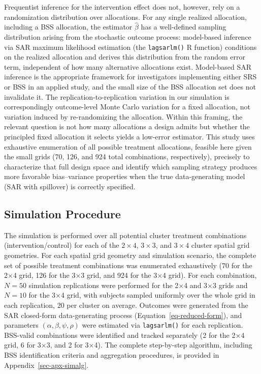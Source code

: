 \documentclass[
  12pt,
  prelim]{bios-prelim}
\begin{document}
Frequentist inference for the intervention effect does not, however,
rely on a randomization distribution over allocations. For any single
realized allocation, including a BSS allocation, the estimator
\(\hat{\beta}\) has a well-defined sampling distribution arising from
the stochastic outcome process: model-based inference via SAR maximum
likelihood estimation (the \texttt{lagsarlm()} R function) conditions on
the realized allocation and derives this distribution from the random
error term, independent of how many alternative allocations exist.
Model-based SAR inference is the appropriate framework for investigators
implementing either SRS or BSS in an applied study, and the small size
of the BSS allocation set does not invalidate it. The
replication-to-replication variation in our simulation is
correspondingly outcome-level Monte Carlo variation for a fixed
allocation, not variation induced by re-randomizing the allocation.
Within this framing, the relevant question is not how many allocations a
design admits but whether the principled fixed allocation it selects
yields a low-error estimator. This study uses exhaustive enumeration of
all possible treatment allocations, feasible here given the small grids
(70, 126, and 924 total combinations, respectively), precisely to
characterize that full design space and identify which sampling strategy
produces more favorable bias--variance properties when the true
data-generating model (SAR with spillover) is correctly specified.

\subsection{Simulation Procedure}\label{sec-sim-procedure}

The simulation is performed over all potential cluster treatment
combinations (intervention/control) for each of the \(2\times4\),
\(3\times3\), and \(3\times4\) cluster spatial grid geometries. For each
spatial grid geometry and simulation scenario, the complete set of
possible treatment combinations was enumerated exhaustively (70 for the
2×4 grid, 126 for the 3×3 grid, and 924 for the 3×4 grid). For each
combination, \(N = 50\) simulation replications were performed for the
2×4 and 3×3 grids and \(N = 10\) for the 3×4 grid, with subjects sampled
uniformly over the whole grid in each replication, 20 per cluster on
average. Outcomes were generated from the SAR closed-form
data-generating process (Equation~\ref{eq-reduced-form}), and parameters
\((\alpha, \beta,
\psi, \rho)\) were estimated via \texttt{lagsarlm()} for each
replication. BSS-valid combinations were identified and tracked
separately (2 for the 2×4 grid, 6 for 3×3, and 2 for 3×4). The complete
step-by-step algorithm, including BSS identification criteria and
aggregation procedures, is provided in Appendix~\ref{sec-apx-simalg}.
\end{document}
